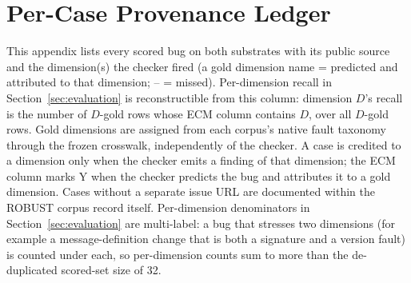 \section{Per-Case Provenance Ledger}\label{app:ledger}
This appendix lists every scored bug on both substrates with its public source and the dimension(s) the checker fired (a gold dimension name = predicted and attributed to that dimension; -- = missed). Per-dimension recall in Section~\ref{sec:evaluation} is reconstructible from this column: dimension $D$'s recall is the number of $D$-gold rows whose ECM column contains $D$, over all $D$-gold rows. Gold dimensions are assigned from each corpus's native fault taxonomy through the frozen crosswalk, independently of the checker. A case is credited to a dimension only when the checker emits a finding of that dimension; the ECM column marks Y when the checker predicts the bug and attributes it to a gold dimension. Cases without a separate issue URL are documented within the ROBUST corpus record itself. Per-dimension denominators in Section~\ref{sec:evaluation} are multi-label: a bug that stresses two dimensions (for example a message-definition change that is both a signature and a version fault) is counted under each, so per-dimension counts sum to more than the de-duplicated scored-set size of 32.

